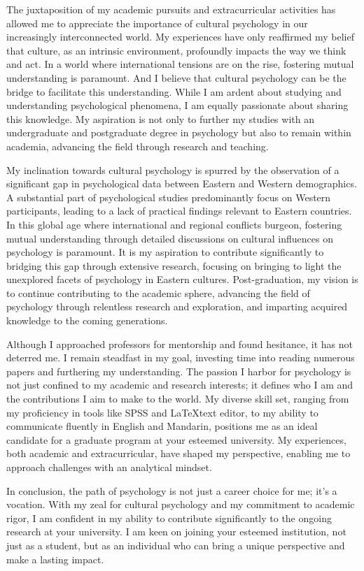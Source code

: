 \documentclass[]{article}
\begin{document}
The juxtaposition of my academic pursuits and extracurricular activities has allowed me to appreciate the importance of cultural psychology in our increasingly interconnected world. My experiences have only reaffirmed my belief that culture, as an intrinsic environment, profoundly impacts the way we think and act. In a world where international tensions are on the rise, fostering mutual understanding is paramount. And I believe that cultural psychology can be the bridge to facilitate this understanding. While I am ardent about studying and understanding psychological phenomena, I am equally passionate about sharing this knowledge. My aspiration is not only to further my studies with an undergraduate and postgraduate degree in psychology but also to remain within academia, advancing the field through research and teaching.

My inclination towards cultural psychology is spurred by the observation of a significant gap in psychological data between Eastern and Western demographics. A substantial part of psychological studies predominantly focus on Western participants, leading to a lack of practical findings relevant to Eastern countries. In this global age where international and regional conflicts burgeon, fostering mutual understanding through detailed discussions on cultural influences on psychology is paramount. It is my aspiration to contribute significantly to bridging this gap through extensive research, focusing on bringing to light the unexplored facets of psychology in Eastern cultures. Post-graduation, my vision is to continue contributing to the academic sphere, advancing the field of psychology through relentless research and exploration, and imparting acquired knowledge to the coming generations.

Although I approached professors for mentorship and found hesitance, it has not deterred me. I remain steadfast in my goal, investing time into reading numerous papers and furthering my understanding. The passion I harbor for psychology is not just confined to my academic and research interests; it defines who I am and the contributions I aim to make to the world. My diverse skill set, ranging from my proficiency in tools like SPSS and \LaTeX text editor, to my ability to communicate fluently in English and Mandarin, positions me as an ideal candidate for a graduate program at your esteemed university. My experiences, both academic and extracurricular, have shaped my perspective, enabling me to approach challenges with an analytical mindset.

In conclusion, the path of psychology is not just a career choice for me; it's a vocation. With my zeal for cultural psychology and my commitment to academic rigor, I am confident in my ability to contribute significantly to the ongoing research at your university. I am keen on joining your esteemed institution, not just as a student, but as an individual who can bring a unique perspective and make a lasting impact.
\end{document}
